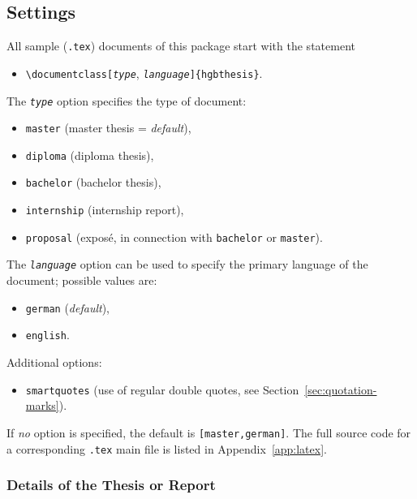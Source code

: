 \subsection{Settings}
\label{sec:hagenberg-settings}

All sample (\verb!.tex!) documents of this package start with the statement
%
\begin{itemize}
    \item[] \verb!\documentclass[!\texttt{\emph{type}},
    \texttt{\emph{language}}\verb!]{hgbthesis}!.
\end{itemize}
%
The \texttt{\emph{type}} option specifies the type of document:
%
\begin{itemize}
    \item[] \texttt{master} (master thesis = \emph{default}),
    \item[] \texttt{diploma} (diploma thesis),
    \item[] \texttt{bachelor} (bachelor thesis),
    \item[] \texttt{internship} (internship report),
	\item[] \texttt{proposal} (exposé, in connection with \texttt{bachelor} or
	\texttt{master}).
\end{itemize}
%
The \texttt{\emph{language}} option can be used to specify the primary language
of the document; possible values are:
%
\begin{itemize}
    \item[] \texttt{german} (\emph{default}),
    \item[] \texttt{english}.
\end{itemize}
%
Additional options:
%
\begin{itemize}
    \item[] \texttt{smartquotes} (use of regular double quotes, see
    Section~\ref{sec:quotation-marks}).
\end{itemize}
%
If \emph{no} option is specified, the default is \texttt{[master,german]}. The
full source code for a corresponding \verb!.tex! main file is listed in
Appendix~\ref{app:latex}.



\subsubsection{Details of the Thesis or Report}

